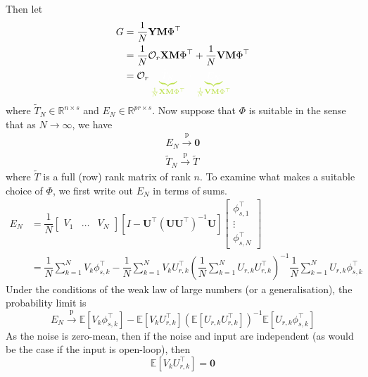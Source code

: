 \documentclass[11pt]{report} %
\begin{document}
Then let
\begin{align}
G &= \dfrac{1}{N}\mathbf{Y}\mathbf{M}\Phi^{\top} \\
&= \dfrac{1}{N}\mathcal{O}_{r}\mathbf{X}\mathbf{M}\Phi^{\top} + \dfrac{1}{N}\mathbf{V}\mathbf{M}\Phi^{\top} \\
&= \mathcal{O}_{r}\green\underbrace{\black \widetilde{T}_{N}}_{\green \frac{1}{N}\mathbf{X}\mathbf{M}\Phi^{\top}}\black + \green\underbrace{\black E_{N}}_{\green \frac{1}{N}\mathbf{V}\mathbf{M}\Phi^{\top}}\black
\end{align}
where $\widetilde{T}_{N} \in \mathbb{R}^{n\times s}$ and $E_{N} \in \mathbb{R}^{pr\times s}$. Now suppose that $\Phi$ is suitable in the sense that as $N \to \infty$, we have
\begin{gather}
E_{N} \overset{\mathrm{p}}{\to} \mathbf{0} \\
\widetilde{T}_{N} \overset{\mathrm{p}}{\to} \widetilde{T}
\end{gather}
where $\widetilde{T}$ is a full (row) rank matrix of rank $n$. To examine what makes a suitable choice of $\Phi$, we first write out $E_{N}$ in terms of sums.
\begin{align}
E_{N} &= \dfrac{1}{N}\begin{bmatrix}
V_{1} & \dots & V_{N}
\end{bmatrix}\left[I - \mathbf{U}^{\top}\left(\mathbf{U}\mathbf{U}^{\top}\right)^{-1}\mathbf{U}\right]\begin{bmatrix}
\phi_{s, 1}^{\top} \\ \vdots \\ \phi_{s, N}^{\top}
\end{bmatrix} \\
&= \dfrac{1}{N}\sum_{k = 1}^{N}V_{k}\phi_{s, k}^{\top} - \dfrac{1}{N}\sum_{k = 1}^{N}V_{k}U_{r, k}^{\top}\left(\dfrac{1}{N}\sum_{k = 1}^{N}U_{r, k}U_{r, k}^{\top}\right)^{-1}\dfrac{1}{N}\sum_{k = 1}^{N}U_{r, k}\phi_{s, k}^{\top}
\end{align}
Under the conditions of the weak law of large numbers (or a generalisation), the probability limit is
\begin{equation}
E_{N} \overset{\mathrm{p}}{\to} \mathbb{E}\left[V_{k}\phi_{s, k}^{\top}\right] - \mathbb{E}\left[V_{k}U_{r, k}^{\top}\right]\left(\mathbb{E}\left[U_{r, k}U_{r, k}^{\top}\right]\right)^{-1}\mathbb{E}\left[U_{r, k}\phi_{s, k}^{\top}\right]
\end{equation}
As the noise is zero-mean, then if the noise and input are independent (as would be the case if the input is open-loop), then
\begin{equation}
\mathbb{E}\left[V_{k}U_{r, k}^{\top}\right] = \mathbf{0}
\end{equation}
\end{document}
